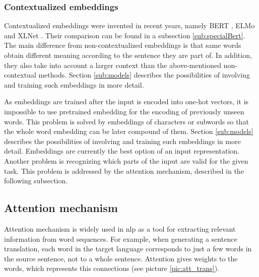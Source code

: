 \subsubsection{Contextualized embeddings}
Contextualized embeddings were invented in recent years, namely BERT \citep{Devlin2019}, ELMo \citep{Peters2018} and XLNet \citep{Yang2019}. %
Their comparison can be found in a subsection \ref{sub:specialBert}. The main difference from non-contextualized embeddings is that same words obtain different meaning according to the sentence they are part of. In addition, they also take into account a larger context than the above-mentioned non-contextual methods. Section \ref{sub:models} describes the possibilities of involving and training such embeddings in more detail.
\par
As embeddings are trained after the input is encoded into one-hot vectors, it is impossible to use pretrained embedding for the encoding of previously unseen words. This problem is solved by embeddings of characters or subwords so that the whole word embedding can be later compound of them. Section \ref{sub:models} describes the possibilities of involving and training such embeddings in more detail. Embeddings are currently the best option of an input representation. Another problem is recognizing which parts of the input are valid for the given task. This problem is addressed by the attention mechanism, described in the following subsection. 

\subsection{Attention mechanism}
\label{sub:attention}
Attention mechanism \citep{Bahdanau} is widely used in \acrshort{nlp} as a tool for extracting relevant information from word sequences. For example, when generating a sentence translation, each word in the target language corresponds to just a few words in the source sentence, not to a whole sentence. Attention gives weights to the words, which represents this connections (see picture \ref{pic:att_trans}).

